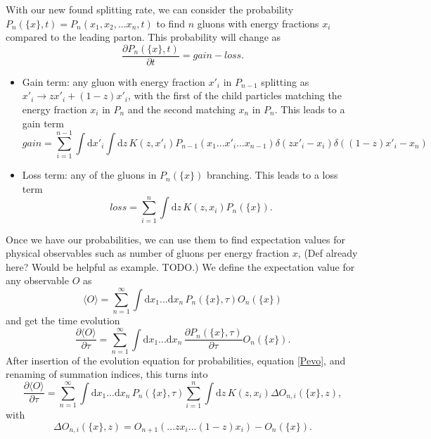\documentclass[a4paper,12pt]{article}
\newcommand{\party}[2]{\frac{\partial{#1}}{\partial{#2}}}
\numberwithin{equation}{section}
\begin{document}
With our new found splitting rate, we can consider the probability ${P_n(\{x\},t)}=P_n(x_1,x_2,...x_n,t)$ to find $n$ gluons with energy fractions $x_i$ compared to the leading parton. This probability will change as
\begin{equation}\label{Pevo}
\party{P_n(\{x\},t)}{t}=gain-loss.
\end{equation}
\begin{itemize}
\item Gain term: any gluon with energy fraction $x'_i$ in $P_{n-1}$ splitting as $x'_i \rightarrow z x'_i + (1-z)x'_i$, with the first of the child particles matching the energy fraction $x_i$ in $P_n$ and the second matching $x_n$ in $P_n$. This leads to a gain term 
\begin{equation}
gain=\sum_{i=1}^{n-1} \int \mathrm{d}x'_i \int \mathrm{d}z\, K(z,x'_i) P_{n-1}(x_1...x'_i...x_{n-1}) \delta(zx'_i-x_i)\delta((1-z)x'_i-x_n)
\end{equation}
\item Loss term: any of the gluons in $P_n(\{x\})$ branching. This leads to a loss term
\begin{equation}
loss=\sum_{i=1}^n \int \mathrm{d}z\, K(z,x_i) P_n(\{x\}).
\end{equation}
\end{itemize} 


Once we have our probabilities, we can use them to find expectation values for physical observables such as number of gluons per energy fraction $x$, (Def already here? Would be helpful as example. TODO.)
We define the expectation value for any observable $O$ as
\begin{equation}
\langle O \rangle = \sum_{n=1}^\infty \int \mathrm{d}x_1...\mathrm{d}x_n \, P_n(\{x\},\tau) O_n(\{x\})
\end{equation}
and get the time evolution 
\begin{equation}
\party{\langle O \rangle}{\tau}=\sum_{n=1}^\infty \int \mathrm{d}x_1...\mathrm{d}x_n \, \party{P_n(\{x\},\tau)}{\tau} O_n(\{x\}).
\end{equation}
%
After insertion of the evolution equation for probabilities, equation \eqref{Pevo}, and renaming of summation indices, this turns into
%
\begin{equation}
\party{\langle O \rangle}{\tau}=\sum_{n=1}^\infty \int \mathrm{d}x_1...\mathrm{d}x_n\, P_n(\{x\},\tau) \sum_{i=1}^n \int \mathrm{d}z\, K(z,x_i) \Delta O_{n,i}(\{x\},z),
\end{equation}
with
\begin{equation}
\Delta O_{n,i}(\{x\},z)=O_{n+1}(...zx_i...(1-z)x_i)-O_n(\{x\}).
\end{equation}
\end{document}
